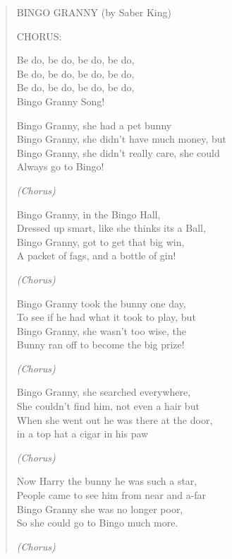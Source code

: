 \begin{verse}
\begin{centering}
\note BINGO GRANNY (by Saber King) \enote
\vspace{3pt}

CHORUS:

Be do, be do, be do, be do, \\
Be do, be do, be do, be do, \\
Be do, be do, be do, be do, \\
Bingo Granny Song!

Bingo    Granny,   she   had     a    pet    bunny  \\
Bingo    Granny,   she   didn't have   much    money,   but \\
Bingo    Granny,   she   didn't  really     care,       she could \\
Always go to  Bingo! 

\emph{(Chorus)}

Bingo    Granny,     in      the Bingo      Hall, \\
Dressed up smart, like   she  thinks   its    a      Ball, \\
Bingo    Granny,    got    to    get        that  big   win, \\
A  packet of fags,  and   a     bottle of gin!


\emph{(Chorus)}

Bingo Granny took the bunny one day, \\
To see if he had what it took to play, but \\
Bingo Granny, she wasn't too wise, the \\
Bunny ran off to become the big prize!

\emph{(Chorus)}

Bingo Granny, she searched everywhere, \\
She couldn't find him, not even a hair but \\
When she went out he was there at the door, \\
in a top hat a cigar in his paw

\emph{(Chorus)}

Now Harry the bunny he was such a star, \\
People came to see him from near and a-far \\
Bingo Granny she was no longer poor, \\
So she could go to Bingo much more.

\emph{(Chorus)}

\end{centering}
\end{verse}

